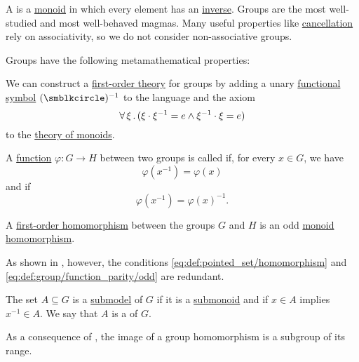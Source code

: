 \begin{definition}\label{def:group}
  A  is a \hyperref[def:monoid]{monoid} in which every element has an \hyperref[def:monoid_inverse]{inverse}. Groups are the most well-studied and most well-behaved magmas. Many useful properties like \hyperref[thm:def:group/properties/cancellative]{cancellation} rely on associativity, so we do not consider non-associative groups.

  Groups have the following metamathematical properties:
  \begin{thmenum}
     We can construct a \hyperref[def:first_order_theory]{first-order theory} for groups by adding a unary \hyperref[def:first_order_language/func]{functional symbol} \( (\anon)^{-1} \) to the language and the axiom
    \begin{equation}\label{eq:def:group/theory/inverse_axiom}
      \forall \thinspace \xi \thinspace . \thinspace (\xi \cdot \xi^{-1} = e \wedge \xi^{-1} \cdot \xi = e)
    \end{equation}
    to the \hyperref[def:monoid/theory]{theory of monoids}.

     A \hyperref[def:function]{function} \( \varphi: G \to H \) between two groups is called  if, for every \( x \in G \), we have
    \begin{equation}\label{eq:def:group/function_parity/even}
      \varphi(x^{-1}) = \varphi(x)
    \end{equation}
    and  if
    \begin{equation}\label{eq:def:group/function_parity/odd}
      \varphi(x^{-1}) = \varphi(x)^{-1}.
    \end{equation}

     A \hyperref[def:first_order_homomorphism]{first-order homomorphism} between the groups \( G \) and \( H \) is an odd \hyperref[def:monoid/homomorphism]{monoid homomorphism}.

    As shown in , however, the conditions \eqref{eq:def:pointed_set/homomorphism} and \eqref{eq:def:group/function_parity/odd} are redundant.

     The set \( A \subseteq G \) is a \hyperref[thm:substructure_is_model]{submodel} of \( G \) if it is a \hyperref[def:monoid/submodel]{submonoid} and if \( x \in A \) implies \( x^{-1} \in A \). We say that \( A \) is a  of \( G \).

    As a consequence of , the image of a group homomorphism is a subgroup of its range.


\end{thmenum}
\end{definition}
